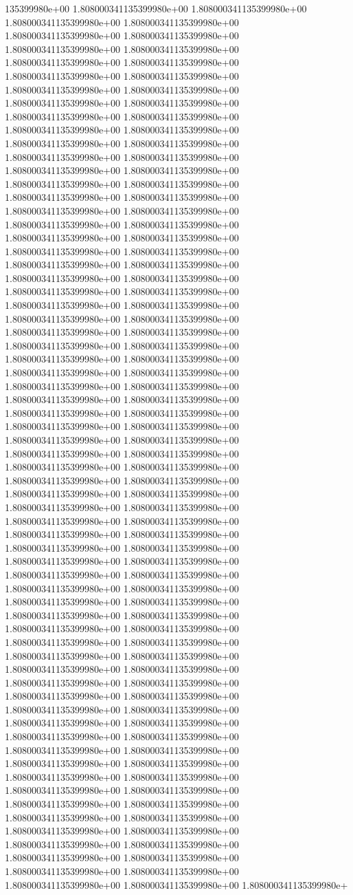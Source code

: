 135399980e+00	1.808000341135399980e+00	1.808000341135399980e+00	1.808000341135399980e+00	1.808000341135399980e+00	1.808000341135399980e+00	1.808000341135399980e+00	1.808000341135399980e+00	1.808000341135399980e+00	1.808000341135399980e+00	1.808000341135399980e+00	1.808000341135399980e+00	1.808000341135399980e+00	1.808000341135399980e+00	1.808000341135399980e+00	1.808000341135399980e+00	1.808000341135399980e+00	1.808000341135399980e+00	1.808000341135399980e+00	1.808000341135399980e+00	1.808000341135399980e+00	1.808000341135399980e+00	1.808000341135399980e+00	1.808000341135399980e+00	1.808000341135399980e+00	1.808000341135399980e+00	1.808000341135399980e+00	1.808000341135399980e+00	1.808000341135399980e+00	1.808000341135399980e+00	1.808000341135399980e+00	1.808000341135399980e+00	1.808000341135399980e+00	1.808000341135399980e+00	1.808000341135399980e+00	1.808000341135399980e+00	1.808000341135399980e+00	1.808000341135399980e+00	1.808000341135399980e+00	1.808000341135399980e+00	1.808000341135399980e+00	1.808000341135399980e+00	1.808000341135399980e+00	1.808000341135399980e+00	1.808000341135399980e+00	1.808000341135399980e+00	1.808000341135399980e+00	1.808000341135399980e+00	1.808000341135399980e+00	1.808000341135399980e+00	1.808000341135399980e+00	1.808000341135399980e+00	1.808000341135399980e+00	1.808000341135399980e+00	1.808000341135399980e+00	1.808000341135399980e+00	1.808000341135399980e+00	1.808000341135399980e+00	1.808000341135399980e+00	1.808000341135399980e+00	1.808000341135399980e+00	1.808000341135399980e+00	1.808000341135399980e+00	1.808000341135399980e+00	1.808000341135399980e+00	1.808000341135399980e+00	1.808000341135399980e+00	1.808000341135399980e+00	1.808000341135399980e+00	1.808000341135399980e+00	1.808000341135399980e+00	1.808000341135399980e+00	1.808000341135399980e+00	1.808000341135399980e+00	1.808000341135399980e+00	1.808000341135399980e+00	1.808000341135399980e+00	1.808000341135399980e+00	1.808000341135399980e+00	1.808000341135399980e+00	1.808000341135399980e+00	1.808000341135399980e+00	1.808000341135399980e+00	1.808000341135399980e+00	1.808000341135399980e+00	1.808000341135399980e+00	1.808000341135399980e+00	1.808000341135399980e+00	1.808000341135399980e+00	1.808000341135399980e+00	1.808000341135399980e+00	1.808000341135399980e+00	1.808000341135399980e+00	1.808000341135399980e+00	1.808000341135399980e+00	1.808000341135399980e+00	1.808000341135399980e+00	1.808000341135399980e+00	1.808000341135399980e+00	1.808000341135399980e+00	1.808000341135399980e+00	1.808000341135399980e+00	1.808000341135399980e+00	1.808000341135399980e+00	1.808000341135399980e+00	1.808000341135399980e+00	1.808000341135399980e+00	1.808000341135399980e+00	1.808000341135399980e+00	1.808000341135399980e+00	1.808000341135399980e+00	1.808000341135399980e+00	1.808000341135399980e+00	1.808000341135399980e+00	1.808000341135399980e+00	1.808000341135399980e+00	1.808000341135399980e+00	1.808000341135399980e+00	1.808000341135399980e+00	1.808000341135399980e+00	1.808000341135399980e+00	1.808000341135399980e+00	1.808000341135399980e+00	1.808000341135399980e+00	1.808000341135399980e+00	1.808000341135399980e+00	1.808000341135399980e+00	1.808000341135399980e+00	1.808000341135399980e+00	1.808000341135399980e+00	1.808000341135399980e+00	1.808000341135399980e+00	1.808000341135399980e+00	1.808000341135399980e+